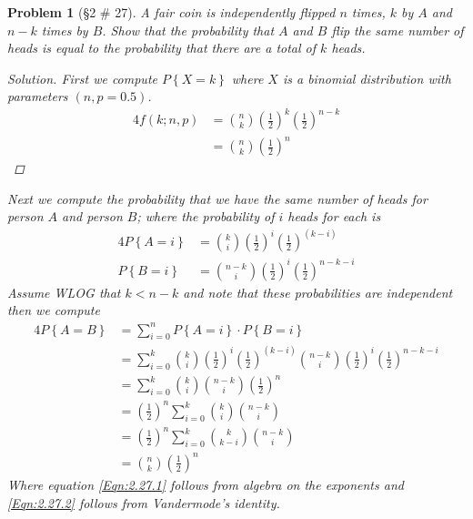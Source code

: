 \documentclass[11pt, oneside]{book}   	%
\newtheorem{problem}{Problem}[chapter]
\newcommand{\paren}[1]{\left(#1\right)}
\newcommand{\set}[1]{\left\{#1\right\}}
\begin{document}
\begin{problem}[\S 2 \# 27]
	A fair coin is independently flipped $n$ times, $k$ by $A$ and $n-k$ times by $B$. Show that the probability that $A$ and $B$ flip the same number of heads is equal to the probability that there are a total of $k$ heads. 
	\begin{proof}[Solution]
		First we compute $P\set{X=k}$ where $X$ is a binomial distribution with parameters $(n, p=0.5)$. 
		\begin{alignat}{4}
			f(k; n, p)&=\binom{n}{k}\paren{\frac{1}{2}}^{k}\paren{\frac{1}{2}}^{n-k} \\
				&=\binom{n}{k}\paren{\frac{1}{2}}^n
		\end{alignat}
	\end{proof}
	Next we compute the probability that we have the same number of heads for person $A$ and person $B$; where the probability of $i$ heads for each is 
	\begin{alignat}{4}
		P\set{A=i}&=\binom{k}{i}\paren{\frac{1}{2}}^i\paren{\frac{1}{2}}^{(k-i)} \\
		P\set{B=i}&=\binom{n-k}{i}\paren{\frac{1}{2}}^{i}\paren{\frac{1}{2}}^{n-k-i}
	\end{alignat}
	Assume WLOG that $k<n-k$ and note that these probabilities are independent then we compute 
	\begin{alignat}{4}
		P\set{A=B}&=\sum_{i=0}^nP\set{A=i}\cdot P\set{B=i} \\
			&=\sum_{i=0}^k\binom{k}{i}\paren{\frac{1}{2}}^i\paren{\frac{1}{2}}^{(k-i)}\binom{n-k}{i}\paren{\frac{1}{2}}^{i}\paren{\frac{1}{2}}^{n-k-i} \\
			&=\sum_{i=0}^k\binom{k}{i}\binom{n-k}{i}\paren{\frac{1}{2}}^n \label{Eqn:2.27.1} \\
			&=\paren{\frac{1}{2}}^n\sum_{i=0}^k\binom{k}{i}\binom{n-k}{i} \\ 
			&=\paren{\frac{1}{2}}^n\sum_{i=0}^k\binom{k}{k-i}\binom{n-k}{i} \\
			&=\binom{n}{k}\paren{\frac{1}{2}}^n \label{Eqn:2.27.2}
	\end{alignat}
	Where equation \ref{Eqn:2.27.1} follows from algebra on the exponents and \ref{Eqn:2.27.2} follows from Vandermode's identity. 
\end{problem}
\end{document}
